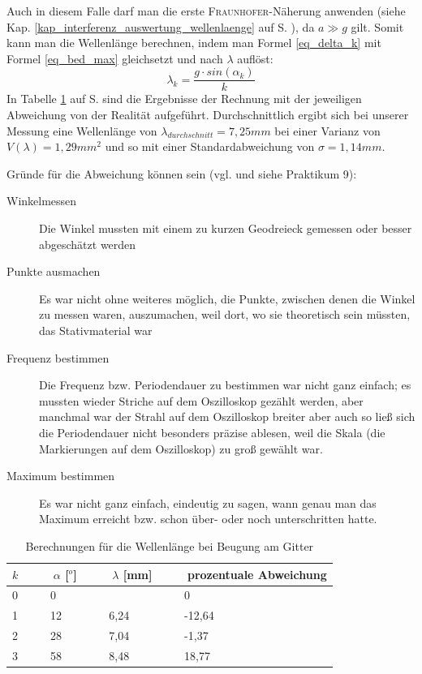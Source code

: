 Auch in diesem Falle darf man die erste \textsc{Fraunhofer}-Näherung anwenden (siehe Kap. \ref{kap_interferenz_auswertung_wellenlaenge} auf S. \pageref{kap_interferenz_auswertung_wellenlaenge}), da \(a \gg g\) gilt. Somit kann man die Wellenlänge berechnen, indem man Formel \ref{eq_delta_k} mit Formel \ref{eq_bed_max} gleichsetzt und nach \(\lambda\) auflöst:
\begin{equation}
   \lambda_k = \frac{g \cdot sin( \alpha_k )}{k}
\end{equation}
In Tabelle \ref{tab_gitter} auf S. \pageref{tab_gitter} sind die Ergebnisse der Rechnung mit der jeweiligen Abweichung von der Realität aufgeführt. Durchschnittlich ergibt sich bei unserer Messung eine Wellenlänge von \(\lambda_{durchschnitt} = 7,25mm\) bei einer Varianz von \(V(\lambda) = 1,29mm^2\) und so mit einer Standardabweichung von \(\sigma = 1,14mm\).

Gründe für die Abweichung können sein (vgl. und siehe Praktikum 9):
\begin{description}
   \item[Winkelmessen] Die Winkel mussten mit einem zu kurzen Geodreieck gemessen oder besser abgeschätzt werden
   \item[Punkte ausmachen] Es war nicht ohne weiteres möglich, die Punkte, zwischen denen die Winkel zu messen waren, auszumachen, weil dort, wo sie theoretisch sein müssten, das Stativmaterial war
   \item[Frequenz bestimmen] Die Frequenz bzw. Periodendauer zu bestimmen war nicht ganz einfach; es mussten wieder Striche auf dem Oszilloskop gezählt werden, aber manchmal war der Strahl auf dem Oszilloskop breiter aber auch so ließ sich die Periodendauer nicht besonders präzise ablesen, weil die Skala (die Markierungen auf dem Oszilloskop) zu groß gewählt war.
   \item[Maximum bestimmen] Es war nicht ganz einfach, eindeutig zu sagen, wann genau man das Maximum erreicht bzw. schon über- oder noch unterschritten hatte.
 \end{description}



\begin{table}
\centering
\begin{tabular}{l|l|l|l}
\(k\)	&~~~	\(\alpha\) [\(^o\)]	&~~~	\(\lambda\) [mm]	&~~~	prozentuale Abweichung\\
\hline
0	&~~~	0	&~~~	~	&~~~	0\\
1	&~~~	12	&~~~	6,24	&~~~	-12,64\\
2	&~~~	28	&~~~	7,04	&~~~	-1,37\\
3	&~~~	58	&~~~	8,48	&~~~	18,77
\end{tabular}
\caption{Berechnungen für die Wellenlänge bei Beugung am Gitter}
\label{tab_gitter}
\end{table}
















